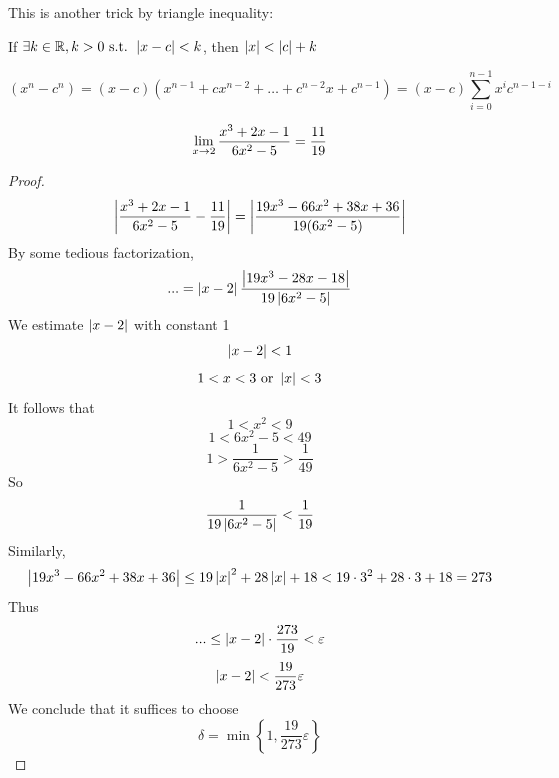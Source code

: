 \documentclass[a4paper,12pt]{article}
\begin{document}
\begin{remark}
    This is another trick by triangle inequality:
    
    If \(\exists k\in\mathbb{R},k>0\text{ s.t. }\left\lvert x-c \right\rvert<k\), then \(\left\lvert x\right\rvert<\left\lvert c\right\rvert+k\)\\
\end{remark}

\begin{remark}
    \[(x^n-c^n)=(x-c)(x^{n-1}+cx^{n-2}+\dots+c^{n-2}x+c^{n-1})=(x-c)\sum_{i=0}^{n-1 }x^i c^{n-1-i}\]
\end{remark}

\newpage

\begin{example}
    \[\lim_{x\rightarrow 2} {\frac{x^3+2x-1}{6x^2-5}}=\frac{11}{19}\]
    \begin{proof}
        \[\left\lvert \frac{x^3+2x-1}{6x^2-5}-\frac{11}{19}\right\rvert=\left\lvert \frac{19x^3-66x^2+38x+36}{19(6x^2-5)}\right\rvert\]
        By some tedious factorization,
        \[...=\left\lvert x-2\right\rvert\frac{\left\lvert 19x^3-28x-18\right\rvert}{19\left\lvert 6x^2-5\right\rvert}\]
        We estimate \(\left\lvert x-2 \right\rvert\) with constant 1
        \[\left\lvert x-2\right\rvert<1\]
        \[1<x<3\text{ or }\left\lvert x \right\rvert<3\]
        It follows that 
        \[1<x^2<9\]
        \[1<6x^2-5<49\]
        \[1>\frac{1}{6x^2-5}>\frac{1}{49}\]
        So
        \[\frac{1}{19\left\lvert 6x^2-5\right\rvert}<\frac{1}{19}\]
        Similarly,
        \[\left\lvert 19x^3-66x^2+38x+36\right\rvert\le19\left\lvert x\right\rvert^2+28\left\lvert x\right\rvert+18 <19\cdot3^2+28\cdot3+18=273\]
        Thus
        \[...\le \left\lvert x-2\right\rvert\cdot\frac{273}{19}<\varepsilon\]
        \[\left\lvert x-2\right\rvert<\frac{19}{273}\varepsilon\]
        We conclude that it suffices to choose 
        \[\delta=\min\left\{1, \frac{19}{273}\varepsilon\right\}\]

    \end{proof}
\end{example}
\newpage
\end{document}
